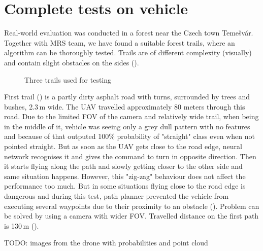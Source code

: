 \section{Complete tests on vehicle}

Real-world evaluation was conducted in a forest near the Czech town Temešvár. Together with \acs{MRS} team, we have found a suitable forest trails, where an algorithm can be thoroughly tested. Trails are of different complexity (visually) and contain slight obstacles on the sides (). 

\begin{figure}[!h]

  \centering

  \centering	
  


  \centering
  \caption{Three trails used for testing}
  \label{fig:trails}
\end{figure}

First trail () is a partly dirty asphalt road with turns, surrounded by trees and bushes, 2.3\,m wide. The \acs{UAV} travelled approximately 80 meters through this road. Due to the limited \acs{FOV} of the camera and relatively wide trail, when being in the middle of it, vehicle was seeing only a grey dull pattern with no features and because of that outputed 100\% probability of "straight" class even when not pointed straight. But as soon as the \acs{UAV} gets close to the road edge, neural network recognises it and gives the command to turn in opposite direction. Then it starts flying along the path and slowly getting closer to the other side and same situation happens. However, this "zig-zag" behaviour does not affect the performance too much. But in some situations flying close to the road edge is dangerous and during this test, path planner prevented the vehicle from executing several waypoints due to their proximity to an obstacle (). Problem can be solved by using a camera with wider \acs{FOV}. Travelled distance on the first path is 130\,m ().

TODO: images from the drone with probabilities and point cloud

